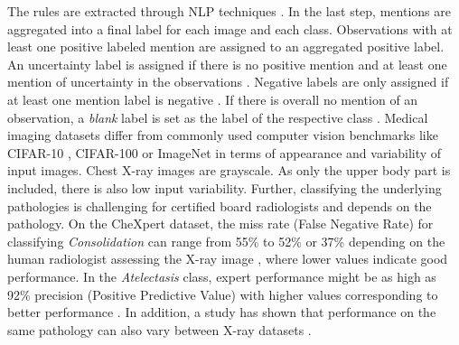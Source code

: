 The rules are extracted through NLP techniques \citep{Irvin2019}.
In the last step, mentions are aggregated into a final label for each image and each class.
Observations with at least one positive labeled mention are assigned to an aggregated positive label.
An uncertainty label is assigned if there is no positive mention and at least one mention of uncertainty in the observations \citep{Irvin2019}.
Negative labels are only assigned if at least one mention label is negative \citep{Irvin2019}. 
If there is overall no mention of an observation, a \textit{blank} label is set as the label of the respective class \citep{Irvin2019}.
Medical imaging datasets differ from commonly used computer vision benchmarks like CIFAR-10 \citep{Krizhevsky2009a}, CIFAR-100 \citep{Krizhevsky2009b} or ImageNet \citep{Deng2009} in terms of appearance and variability of input images.
Chest X-ray images are grayscale.
As only the upper body part is included, there is also low input variability.
Further, classifying the underlying pathologies is challenging for certified board radiologists and depends on the pathology.
On the CheXpert dataset, the miss rate (False Negative Rate) for classifying \textit{Consolidation} can range from 55\% to 52\% or 37\% depending on the human radiologist assessing the X-ray image \citep{Irvin2019}, where lower values indicate good performance.
In the \textit{Atelectasis} class, expert performance might be as high as 92\% precision (Positive Predictive Value) with higher values corresponding to better performance \citep{Irvin2019}.
In addition, a study has shown that performance on the same pathology can also vary between X-ray datasets \citep{Majkowska2020}.
\par

